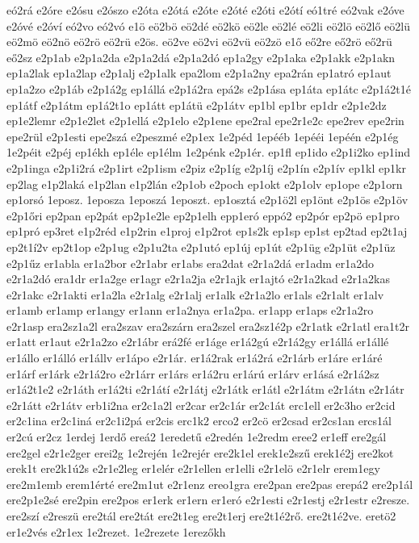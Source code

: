 {eó2rá
e2óre
e2ósu
e2ószo
e2óta
e2ótá
e2óte
e2óté
e2óti
e2ótí
eó1tré
eó2vak
e2óve
e2óvé
e2óví
eó2vo
eó2vó
e1ö
eö2bö
eö2dé
eö2kö
eö2le
eö2lé
eö2li
eö2lö
eö2lő
eö2lü
eö2mö
eö2nö
eö2rö
eö2rü
e2ös.
eö2ve
eö2vi
eö2vü
eö2zö
e1ő
eő2re
eő2rö
eő2rü
eő2sz
e2p1ab
e2p1a2da
e2p1a2dá
e2p1a2dó
ep1a2gy
e2p1aka
e2p1akk
e2p1akn
ep1a2lak
ep1a2lap
e2p1alj
e2p1alk
epa2lom
e2p1a2ny
epa2rán
ep1atró
ep1aut
ep1a2zo
e2p1áb
e2p1á2g
ep1állá
e2p1á2ra
epá2s
e2p1ása
ep1áta
ep1átc
e2p1á2t1é
ep1átf
e2p1átm
ep1á2t1o
ep1átt
ep1átü
e2p1átv
ep1bl
ep1br
ep1dr
e2p1e2dz
ep1e2lemr
e2p1e2let
e2p1ellá
e2p1elo
e2p1ene
epe2ral
epe2r1e2c
epe2rev
epe2rin
epe2rül
e2p1esti
epe2szá
e2peszmé
e2p1ex
1e2péd
1epééb
1epééi
1epéén
e2p1ég
1e2péit
e2péj
ep1ékh
ep1éle
ep1élm
1e2pénk
e2p1ér.
ep1fl
ep1ido
e2p1i2ko
ep1ind
e2p1inga
e2p1i2rá
e2p1irt
e2p1ism
e2piz
e2p1íg
e2p1íj
e2p1ín
e2p1ív
ep1kl
ep1kr
ep2lag
e1p2laká
e1p2lan
e1p2lán
e2p1ob
e2poch
ep1okt
e2p1olv
ep1ope
e2p1orn
ep1orsó
1eposz.
1eposza
1eposzá
1eposzt.
ep1osztá
e2p1ö2l
ep1önt
e2p1ös
e2p1öv
e2p1őri
ep2pan
ep2pát
ep2p1e2le
ep2p1elh
epp1eró
eppó2
ep2pór
ep2pö
ep1pro
ep1pró
ep3ret
e1p2réd
e1p2rin
e1proj
e1p2rot
ep1s2k
ep1sp
ep1st
ep2tad
ep2t1aj
ep2t1í2v
ep2t1op
e2p1ug
e2p1u2ta
e2p1utó
ep1új
ep1út
e2p1üg
e2p1üt
e2p1üz
e2p1űz
er1abla
er1a2bor
e2r1abr
er1abs
era2dat
e2r1a2dá
er1adm
er1a2do
e2r1a2dó
era1dr
er1a2ge
er1agr
e2r1a2ja
e2r1ajk
er1ajtó
e2r1a2kad
e2r1a2kas
e2r1akc
e2r1akti
er1a2la
e2r1alg
e2r1alj
er1alk
e2r1a2lo
er1als
e2r1alt
er1alv
er1amb
er1amp
er1angy
er1ann
er1a2nya
er1a2pa.
er1app
er1aps
e2r1a2ro
e2r1asp
era2sz1a2l
era2szav
era2szárn
era2szel
era2sz1é2p
e2r1atk
e2r1atl
era1t2r
er1att
er1aut
e2r1a2zo
e2r1ábr
erá2fé
er1áge
er1á2gú
e2r1á2gy
er1állá
er1állé
er1állo
er1álló
er1állv
er1ápo
e2r1ár.
er1á2rak
er1á2rá
e2r1árb
er1áre
er1áré
er1árf
er1árk
e2r1á2ro
e2r1árr
er1árs
er1á2ru
er1árú
er1árv
er1ásá
e2r1á2sz
er1á2t1e2
e2r1áth
er1á2ti
e2r1átí
e2r1átj
e2r1átk
er1átl
e2r1átm
e2r1átn
e2r1átr
e2r1átt
e2r1átv
erb1i2na
er2c1a2l
er2car
er2c1ár
er2c1át
erc1ell
er2c3ho
er2cid
er2c1ina
er2c1iná
er2c1i2pá
er2cis
erc1k2
erco2
er2cö
er2csad
er2cs1an
ercs1ál
er2cú
er2cz
1erdej
1erdő
ereá2
1eredetű
e2redén
1e2redm
eree2
er1eff
ere2gál
ere2gel
e2r1e2ger
erei2g
1e2rején
1e2rejér
ere2k1el
erek1e2szű
erek1é2j
ere2kot
erek1t
ere2k1ú2s
e2r1e2leg
er1elér
e2r1ellen
er1elli
e2r1elö
e2r1elr
erem1egy
ere2m1emb
erem1érté
ere2m1ut
e2r1enz
ereo1gra
ere2pan
ere2pas
erepá2
ere2p1ál
ere2p1e2sé
ere2pin
ere2pos
er1erk
er1ern
er1eró
e2r1esti
e2r1estj
e2r1estr
e2resze.
ere2szí
e2reszü
ere2tál
ere2tát
ere2t1eg
ere2t1erj
ere2t1é2rő.
ere2t1é2ve.
eretö2
er1e2vés
e2r1ex
1e2rezet.
1e2rezete
1erezőkh
}
